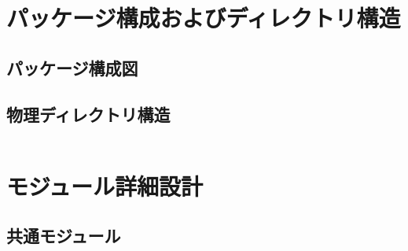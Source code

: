 \documentclass{docs}
\begin{document}

\section{パッケージ構成およびディレクトリ構造}

\subsection{パッケージ構成図}

\subsection{物理ディレクトリ構造}
\begin{verbatim}

\end{verbatim}


\section{モジュール詳細設計}

\subsection{共通モジュール}
\newpage
\end{document}
